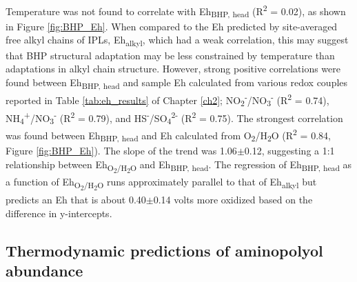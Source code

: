 Temperature was not found to correlate with Eh\textsubscript{BHP, head} (R\textsuperscript{2} = 0.02), as shown in Figure \ref{fig:BHP_Eh}. When compared to the Eh predicted by site-averaged free alkyl chains of IPLs, Eh\textsubscript{alkyl}, which had a weak correlation, this may suggest that BHP structural adaptation may be less constrained by temperature than adaptations in alkyl chain structure. However, strong positive correlations were found between Eh\textsubscript{BHP, head} and sample Eh calculated from various redox couples reported in Table \ref{tab:eh_results} of Chapter \ref{ch2}; NO\textsubscript{2}\textsuperscript{-}/NO\textsubscript{3}\textsuperscript{-} (R\textsuperscript{2} = 0.74), NH\textsubscript{4}\textsuperscript{+}/NO\textsubscript{3}\textsuperscript{-} (R\textsuperscript{2} = 0.79), and HS\textsuperscript{-}/SO\textsubscript{4}\textsuperscript{2-} (R\textsuperscript{2} = 0.75). The strongest correlation was found between Eh\textsubscript{BHP, head} and Eh calculated from O\textsubscript{2}/H\textsubscript{2}O (R\textsuperscript{2} = 0.84, Figure \ref{fig:BHP_Eh}). The slope of the trend was 1.06$\pm$0.12, suggesting a 1:1 relationship between Eh\textsubscript{O\textsubscript{2}/H\textsubscript{2}O} and Eh\textsubscript{BHP, head}. The regression of Eh\textsubscript{BHP, head} as a function of Eh\textsubscript{O\textsubscript{2}/H\textsubscript{2}O} runs approximately parallel to that of Eh\textsubscript{alkyl} but predicts an Eh that is about 0.40$\pm$0.14 volts more oxidized based on the difference in y-intercepts.

\subsection{Thermodynamic predictions of aminopolyol abundance}


